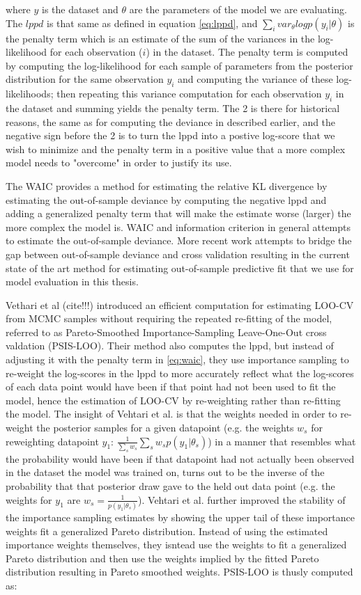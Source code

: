 where $y$ is the dataset and $\theta$ are the parameters of the model we are evaluating. The $lppd$ is that same as defined in equation \ref{eq:lppd}, and $\sum_i var_{\theta} logp(y_i|\theta)$ is the penalty term which is an estimate of the sum of the variances in the log-likelihood for each observation ($i$) in the dataset. The penalty term is computed by computing the log-likelihood for each sample of parameters from the posterior distribution for the same observation $y_i$ and computing the variance of these log-likelihoods; then repeating this variance computation for each observation $y_i$ in the dataset and summing yields the penalty term. The 2 is there for historical reasons, the same as for computing the deviance in described earlier, and the negative sign before the 2 is to turn the lppd into a postive log-score that we wish to minimize and the penalty term in a positive value that a more complex model needs to "overcome" in order to justify its use.

The WAIC provides a method for estimating the relative KL divergence by estimating the out-of-sample deviance by computing the negative lppd and adding a generalized penalty term that will make the estimate worse (larger) the more complex the model is. WAIC and information criterion in general attempts to estimate the out-of-sample deviance. More recent work attempts to bridge the gap between out-of-sample deviance and cross validation resulting in the current state of the art method for estimating out-of-sample predictive fit that we use for model evaluation in this thesis.

Vethari et al (cite!!!) introduced an efficient computation for estimating LOO-CV from MCMC samples without requiring the repeated re-fitting of the model, referred to as Pareto-Smoothed Importance-Sampling Leave-One-Out cross valdation (PSIS-LOO). Their method also computes the lppd, but instead of adjusting it with the penalty term in \ref{eq:waic}, they use importance sampling to re-weight the log-scores in the lppd to more accurately reflect what the log-scores of each data point would have been if that point had not been used to fit the model, hence the estimation of LOO-CV by re-weighting rather than re-fitting the model. The insight of Vehtari et al. is that the weights needed in order to re-weight the posterior samples for a given datapoint (e.g. the weights $w_s$ for reweighting datapoint $y_1$: $\frac{1}{\sum_s w_s} \sum_s w_s p(y_1 | \theta_s)$) in a manner that resembles what the probability would have been if that datapoint had not actually been observed in the dataset the model was trained on, turns out to be the inverse of the probability that that posterior draw gave to the held out data point (e.g. the weights for $y_1$ are $w_s = \frac{1}{p(y_1|\theta_s)}$). Vehtari et al. further improved the stability of the importance sampling estimates by showing the upper tail of these importance weights fit a generalized Pareto distribution. Instead of using the estimated importance weights themselves, they isntead use the weights to fit a generalized Pareto distribution and then use the weights implied by the fitted Pareto distribution resulting in Pareto smoothed weights. PSIS-LOO is thusly computed as:


